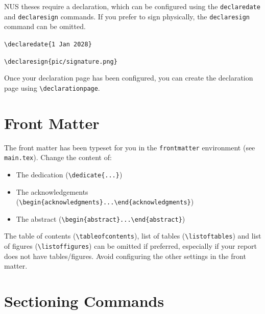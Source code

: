 NUS theses require a declaration, which can be configured using the
\texttt{declaredate} and \texttt{declaresign} commands. If you prefer
to sign physically, the \texttt{declaresign} command can be omitted.

\texttt{\textbackslash declaredate\{1 Jan 2028\}}

\texttt{\textbackslash declaresign\{pic/signature.png\}}

Once your declaration page has been configured, you can create the
declaration page using \texttt{\textbackslash declarationpage}.

\section{Front Matter}

The front matter has been typeset for you in the \texttt{frontmatter}
environment (see \texttt{main.tex}). Change the content of:
\begin{itemize}
    \item The dedication (\texttt{\textbackslash dedicate\{...\}})
    \item The acknowledgements (\texttt{\textbackslash begin\{acknowledgments\}...\textbackslash end\{acknowledgments\}})
    \item The abstract (\texttt{\textbackslash begin\{abstract\}...\textbackslash end\{abstract\}})
\end{itemize}
The table of contents (\texttt{\textbackslash tableofcontents}), list of tables
(\texttt{\textbackslash listoftables}) and list of figures (\texttt{\textbackslash listoffigures})
can be omitted if preferred, especially if your report does not have tables/figures. Avoid
configuring the other settings in the front matter.

\section{Sectioning Commands}

